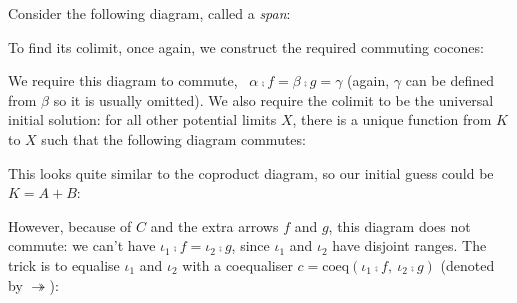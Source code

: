 Consider the following diagram, called a \emph{span}:

\begin{center}
\end{center}

To find its colimit, once again, we construct the required commuting cocones:

\begin{center}
\end{center}

We require this diagram to commute, \ie\ $\alpha \comp f = \beta \comp g = \gamma$ (again, $\gamma$ can be defined from $\beta$ so it is usually omitted). We also require the colimit to be the universal initial solution: for all other potential limits $X$, there is a unique function from $K$ to $X$ such that the following diagram commutes:


\begin{center}
\end{center}


This looks quite similar to the coproduct diagram, so our initial guess could be $K = A + B$:


\begin{center}
\end{center}

However, because of $C$ and the extra arrows $f$ and $g$, this diagram does not commute: we can't have $\iota_1 \comp f = \iota_2 \comp g$, since $\iota_1$ and $\iota_2$ have disjoint ranges. The trick is to equalise $\iota_1$ and $\iota_2$ with a coequaliser $c = \text{coeq} (\iota_1 \comp f,\ \iota_2 \comp g )$ (denoted by $\twoheadrightarrow$):


